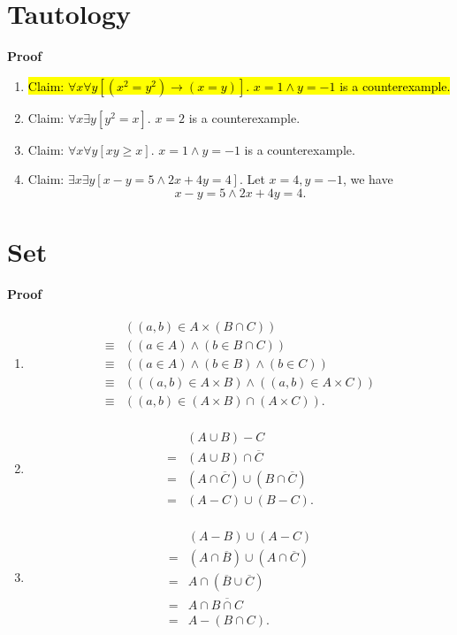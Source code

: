 \documentclass{../../cls/sig-alternate-05-2015}
\begin{document}
\section{Tautology}
\textbf{Proof}\begin{enumerate}[label=(\alph*)]
	\item \hl{Claim: $\forall x \forall y [(x^2 = y^2) \rightarrow (x = y)]$. $x = 1 \land y = -1$ is a counterexample.}
	\item Claim: $\forall x \exists y [y^2 = x]$. $x = 2$ is a counterexample.
	\item Claim: $\forall x \forall y [xy \ge x]$. $x = 1 \land y = -1$ is a counterexample.
	\item Claim: $\exists x \exists y [x - y = 5 \land 2x + 4y = 4]$. Let $x = 4, y = -1$, we have \begin{equation}
		x - y = 5 \land 2x + 4y = 4.
	\end{equation}
\end{enumerate}

\section{Set}
\textbf{Proof}\begin{enumerate}[label=(\alph*)]
	\item \begin{align}
		\begin{aligned}
		& ((a, b) \in A \times (B \cap C))\\
		\equiv & ((a \in A) \land (b \in B \cap C))\\
		\equiv & ((a \in A) \land (b \in B) \land (b \in C))\\
		\equiv & (((a, b) \in A \times B) \land ((a, b) \in A \times C))\\
		\equiv & ((a, b) \in (A \times B) \cap (A \times C)).
		\end{aligned}
	\end{align}
	\item \begin{align}
		\begin{aligned}
		& (A \cup B) - C\\
		= & (A \cup B) \cap \overline{C}\\
		= & (A \cap \overline{C}) \cup (B \cap \overline{C})\\
		= & (A - C) \cup (B - C).
		\end{aligned}
	\end{align}
	\item \begin{align}
		\begin{aligned}
		& (A - B) \cup (A - C)\\
		= & (A \cap \overline{B}) \cup (A \cap \overline{C})\\
		= & A \cap (\overline{B} \cup \overline{C})\\
		= & A \cap \overline{B \cap C}\\
		= & A - (B \cap C).
		\end{aligned}
	\end{align}
\end{enumerate}
\end{document}

